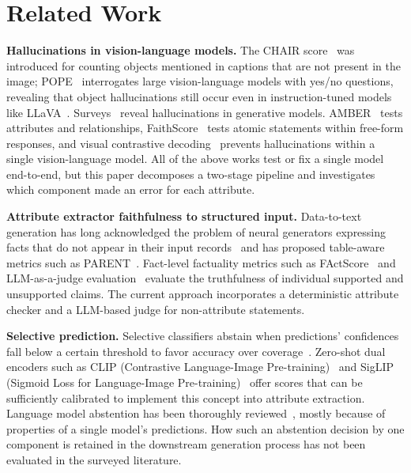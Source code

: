 \documentclass[runningheads]{llncs}
\begin{document}
\section{Related Work}\label{sec:related}
\textbf{Hallucinations in vision-language models.} The CHAIR score~\cite{rohrbach2018chair} was introduced for counting objects mentioned in captions that are not present in the image; POPE~\cite{li2023pope} interrogates large vision-language models with yes/no questions, revealing that object hallucinations still occur even in instruction-tuned models like LLaVA~\cite{liu2023llava}. Surveys~\cite{ji2023survey} reveal hallucinations in generative models. AMBER~\cite{wang2023amber} tests attributes and relationships, FaithScore~\cite{jing2024faithscore} tests atomic statements within free-form responses, and visual contrastive decoding~\cite{leng2024vcd} prevents hallucinations within a single vision-language model. All of the above works test or fix a single model end-to-end, but this paper decomposes a two-stage pipeline and investigates which component made an error for each attribute.

\textbf{Attribute extractor faithfulness to structured input.} Data-to-text generation has long acknowledged the problem of neural generators expressing facts that do not appear in their input records~\cite{wiseman2017challenges} and has proposed table-aware metrics such as PARENT~\cite{dhingra2019parent}. Fact-level factuality metrics such as FActScore~\cite{min2023factscore} and LLM-as-a-judge evaluation~\cite{zheng2023judging} evaluate the truthfulness of individual supported and unsupported claims. The current approach incorporates a deterministic attribute checker and a LLM-based judge for non-attribute statements.

\textbf{Selective prediction.} Selective classifiers abstain when predictions' confidences fall below a certain threshold to favor accuracy over coverage~\cite{geifman2017selective}. Zero-shot dual encoders such as CLIP (Contrastive Language-Image Pre-training)~\cite{radford2021clip} and SigLIP (Sigmoid Loss for Language-Image Pre-training)~\cite{zhai2023siglip} offer scores that can be sufficiently calibrated to implement this concept into attribute extraction. Language model abstention has been thoroughly reviewed~\cite{wen2025abstention}, mostly because of properties of a single model's predictions. How such an abstention decision by one component is retained in the downstream generation process has not been evaluated in the surveyed literature.
\end{document}
